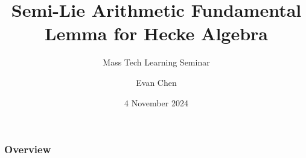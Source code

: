 \documentclass[11pt]{beamer}
\title[Semi-Lie AFL for Hecke]{Semi-Lie Arithmetic Fundamental Lemma for Hecke Algebra}
\subtitle{Mass Tech Learning Seminar}
\author{Evan Chen}
\date{4 November 2024}
\begin{document}
\begin{frame}
  \frametitle{Overview}
\end{frame}
\end{document}
